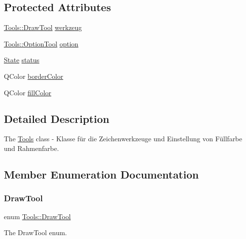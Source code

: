 \subsection*{Protected Attributes}
\begin{DoxyCompactItemize}
\item 
\hyperlink{class_tools_ab031688a77e89a80ce8b5db7014684a3}{Tools\+::\+Draw\+Tool} \hyperlink{class_tools_a8777299234b214fb917f42c0ef1a0ead}{werkzeug}
\item 
\hyperlink{class_tools_a4b55b2ca4eef4d80ae1042233832bb8b}{Tools\+::\+Option\+Tool} \hyperlink{class_tools_a9bf140c9c0af40044aaa2c115b632399}{option}
\item 
\hyperlink{class_tools_a2847c269682818722541d9002fdf0824}{State} \hyperlink{class_tools_a9ee6b69697a16133db9d1f24346cd838}{status}
\item 
Q\+Color \hyperlink{class_tools_af7de157c4f6575664512accd32d93a43}{border\+Color}
\item 
Q\+Color \hyperlink{class_tools_a522e6149eb1349df97fa1bb7abaec427}{fill\+Color}
\end{DoxyCompactItemize}


\subsection{Detailed Description}
The \hyperlink{class_tools}{Tools} class -\/ Klasse für die Zeichenwerkzeuge und Einstellung von Füllfarbe und Rahmenfarbe. 

\subsection{Member Enumeration Documentation}
\mbox{\label{class_tools_ab031688a77e89a80ce8b5db7014684a3}} 
\subsubsection{\texorpdfstring{Draw\+Tool}{DrawTool}}
{\footnotesize\ttfamily enum \hyperlink{class_tools_ab031688a77e89a80ce8b5db7014684a3}{Tools\+::\+Draw\+Tool}}



The Draw\+Tool enum. 

